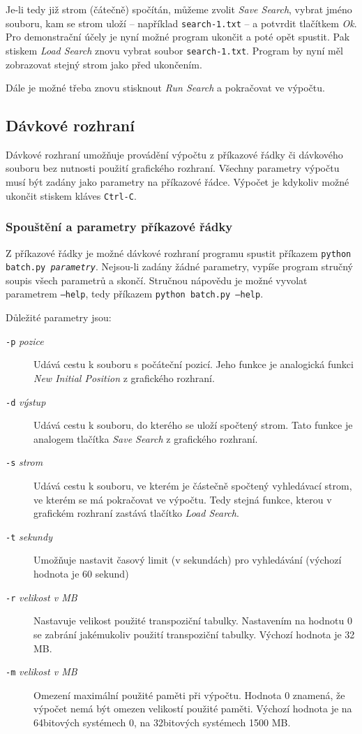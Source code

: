 \documentclass{article}
\begin{document}
Je-li tedy již strom (čátečně) spočítán, můžeme zvolit \emph{Save Search}, vybrat jméno souboru, kam se strom uloží --
například \texttt{search-1.txt} -- a potvrdit tlačítkem \emph{Ok}. Pro demonstrační účely je nyní možné program ukončit
a poté opět spustit. Pak stiskem \emph{Load Search} znovu vybrat soubor \texttt{search-1.txt}. Program by nyní měl
zobrazovat stejný strom jako před ukončením.

Dále je možné třeba znovu stisknout \emph{Run Search} a pokračovat ve výpočtu.

\subsection{Dávkové rozhraní}
Dávkové rozhraní umožňuje provádění výpočtu z příkazové řádky či dávkového souboru bez nutnosti použití grafického
rozhraní. Všechny parametry výpočtu musí být zadány jako parametry na příkazové řádce. Výpočet je kdykoliv možné ukončit
stiskem kláves \texttt{Ctrl-C}.

\subsubsection{Spouštění a parametry příkazové řádky}
Z příkazové řádky je možné dávkové rozhraní programu spustit příkazem \texttt{python batch.py \textit{parametry}}.
Nejsou-li zadány žádné parametry, vypíše program stručný soupis všech parametrů a skončí. Stručnou nápovědu je možné
vyvolat parametrem \texttt{--help}, tedy příkazem \texttt{python batch.py --help}.

Důležité parametry jsou:\begin{description}
  \item[\texttt{-p} \textit{pozice}] Udává cestu k souboru s počáteční pozicí. Jeho funkce je analogická funkci
    \emph{New Initial Position} z grafického rozhraní.
  \item[\texttt{-d} \textit{výstup}] Udává cestu k souboru, do kterého se uloží spočtený strom. Tato funkce je analogem
    tlačítka \emph{Save Search} z grafického rozhraní.
  \item[\texttt{-s} \textit{strom}] Udává cestu k souboru, ve kterém je částečně spočtený vyhledávací strom, ve kterém
    se má pokračovat ve výpočtu. Tedy stejná funkce, kterou v grafickém rozhraní zastává tlačítko \emph{Load Search}.
  \item[\texttt{-t} \textit{sekundy}] Umožňuje nastavit časový limit (v sekundách) pro vyhledávání (výchozí hodnota je
    60 sekund)
  \item[\texttt{-r} \textit{velikost v MB}] Nastavuje velikost použité transpoziční tabulky. Nastavením na hodnotu 0 se zabrání
    jakémukoliv použití transpoziční tabulky. Výchozí hodnota je 32 MB.
  \item[\texttt{-m} \textit{velikost v MB}] Omezení maximální použité paměti při výpočtu. Hodnota 0 znamená, že výpočet nemá
    být omezen velikostí použité paměti. Výchozí hodnota je na 64bitových systémech 0, na 32bitových systémech 1500 MB.
\end{description}
\end{document}
